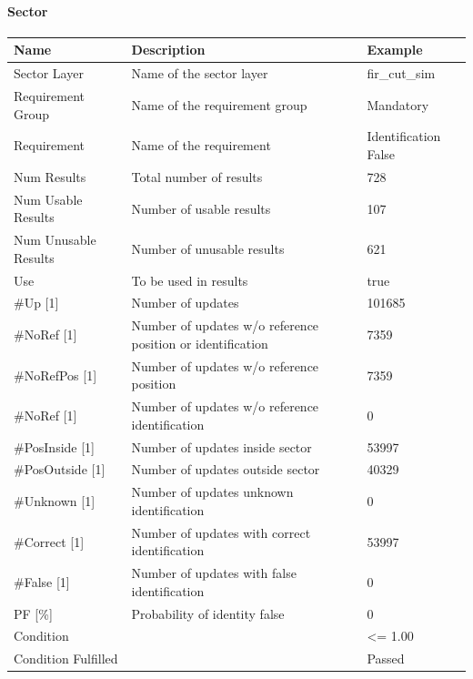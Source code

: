 \paragraph{Sector}

\begin{center}
 \begin{table}[H]
  \begin{tabularx}{\textwidth}{ | l | X |  l | }
    \hline
    \textbf{Name} & \textbf{Description} & \textbf{Example} \\ \hline
    Sector Layer & Name of the sector layer & fir\_cut\_sim \\ \hline
    Requirement Group & Name of the requirement group & Mandatory \\ \hline
    Requirement & Name of the requirement & Identification False \\ \hline
    Num Results & Total number of results & 728 \\ \hline
    Num Usable Results & Number of usable results & 107 \\ \hline
    Num Unusable Results & Number of unusable results & 621 \\ \hline
    Use & To be used in results & true \\ \hline
    \#Up [1] & Number of updates & 101685 \\ \hline
    \#NoRef [1] & Number of updates w/o reference position or identification & 7359 \\ \hline
    \#NoRefPos [1] & Number of updates w/o reference position  & 7359 \\ \hline
    \#NoRef [1] & Number of updates w/o reference identification & 0 \\ \hline
    \#PosInside [1] & Number of updates inside sector & 53997 \\ \hline
    \#PosOutside [1] & Number of updates outside sector & 40329 \\ \hline
    \#Unknown [1] & Number of updates unknown identification & 0 \\ \hline
    \#Correct [1] & Number of updates with correct identification & 53997 \\ \hline
    \#False [1] & Number of updates with false identification & 0 \\ \hline
    PF [\%] & Probability of identity false & 0 \\ \hline
    Condition &  & <= 1.00 \\ \hline
    Condition Fulfilled &  & Passed \\ \hline
\end{tabularx}
\end{table}
\end{center}

